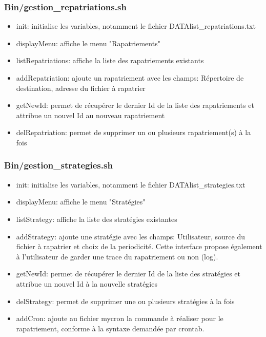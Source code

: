 \documentclass[a4paper,11pt]{article}
\begin{document}
		\subsubsection{Bin/gestion\_repatriations.sh}
			\begin{itemize}
				\item init: initialise les variables, notamment le fichier DATA\/list\_repatriations.txt
				\item displayMenu: affiche le menu "Rapatriements"
				\item listRepatriations: affiche la liste des rapatriements existants
				\item addRepatriation: ajoute un rapatriement avec les champs: Répertoire de destination, adresse du fichier à rapatrier
				\item getNewId: permet de récupérer le dernier Id de la liste des rapatriements et attribue un nouvel Id au nouveau rapatriement
				\item delRepatriation: permet de supprimer un ou plusieurs rapatriement(s) à la fois
			\end{itemize}
	
		\subsubsection{Bin/gestion\_strategies.sh}
			\begin{itemize}
				\item init: initialise les variables, notamment le fichier DATA\/list\_strategies.txt
				\item displayMenu: affiche le menu "Stratégies"
				\item listStrategy: affiche la liste des stratégies existantes
				\item addStrategy: ajoute une stratégie avec les champs: Utilisateur, source du fichier à rapatrier et choix de la periodicité. Cette interface propose également à l'utilisateur de garder une trace du rapatriement ou non (log). 
				\item getNewId: permet de récupérer le dernier Id de la liste des stratégies et attribue un nouvel Id à la nouvelle stratégies
				\item delStrategy: permet de supprimer une ou plusieurs stratégies à la fois
				\item addCron: ajoute au fichier mycron la commande à réaliser pour le rapatriement, conforme à la syntaxe demandée par crontab. 
			\end{itemize}
	
\end{document}
